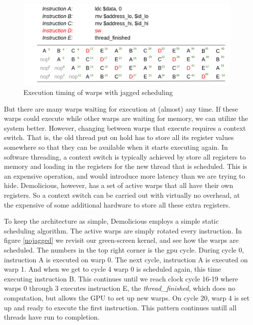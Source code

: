 \documentclass[../main/report.tex]{subfiles}
\begin{document}
\begin{figure}[htp]
\centering
\includegraphics[scale=0.23]{../gpu/diagrams/jaktstart_num.png}
\caption{Execution timing of warps with jagged scheduling}
\label{jagged}
\end{figure}

But there are many warps waiting for execution at (almost) any time. 
If these warps could execute while other warps are waiting for memory, we can utilize the system better.
However, changing between warps that execute requires a context switch. 
That is, the old thread put on hold has to store all its register values somewhere so that they can be available when it starts executing again.
In software threading, a context switch is typically achieved by store all registers to memory and loading in the registers for the new thread that is scheduled.
This is an expensive operation, and would introduce more latency than we are trying to hide.
Demolicious, however, has a set of active warps that all have their own registers.
So a context switch can be carried out with virtually no overhead, at the expensive of some additional hardware to store all these extra registers.

To keep the architecture as simple, Demolicious employs a simple static scheduling algorithm. 
The active warps are simply rotated every instruction. In figure \ref{nojagged} we revisit our green-screen kernel, and see how the warps are scheduled. 
The numbers in the top right corner is the gpu cycle. 
During cycle 0, instruction A is executed on warp 0. 
The next cycle, instruction A is executed on warp 1. 
And when we get to cycle 4 warp 0 is scheduled again, this time executing instruction B.
This continues until we reach clock cycle 16-19 where warps 0 through 3 executes instruction E, the \emph{thread\_finished}, which does no computation, but allows the GPU to set up new warps.
On cycle 20, warp 4 is set up and ready to execute the first instruction.
This pattern continues untill all threads have run to completion. 
\end{document}
